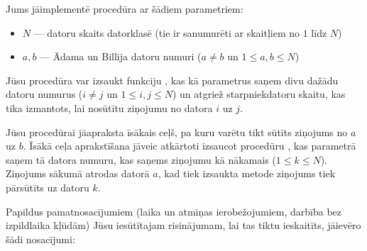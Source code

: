 \documentclass{boi2014-lv}
\begin{document}
    \Implementation
		Jums jāimplementē procedūra  ar šādiem parametriem:

    \begin{itemize}
        \item $N$ --- datoru skaits datorklasē
            (tie ir sanumurēti ar skaitļiem no $1$ līdz $N$)
        \item $a, b$ --- Ādama un Billija datoru numuri
            ($a \neq b$ un $1 \le a, b \le N$)
    \end{itemize}

		Jūsu procedūra  var izsaukt funkciju ,
		kas kā parametrus saņem divu dažādu datoru numurus ($i \neq j$ un $1 \le i, j \le N$)
		un atgriež starpniekdatoru skaitu, kas tika izmantots, lai nosūtītu ziņojumu no datora
		$i$ uz $j$.

		Jūsu procedūrai  jāapraksta īsākais ceļš, pa kuru varētu tikt sūtīts 
		ziņojums no $a$ uz $b$. Īsākā ceļa aprakstīšana jāveic atkārtoti izsaucot procedūru
		, kas parametrā saņem tā datora numuru, kas saņems ziņojumu kā nākamais ($1 \le k \le N$).
		Ziņojums sākumā atrodas datorā $a$, kad tiek izsaukta metode  ziņojums tiek pārsūtīts uz datoru $k$.

		Papildus pamatnosacījumiem (laika un atmiņas ierobežojumiem, 
		darbība bez izpildlaika kļūdām) Jūsu iesūtītajam risinājumam, lai tas tiktu ieskaitīts, 
		jāievēro šādi nosacījumi:
\end{document}
